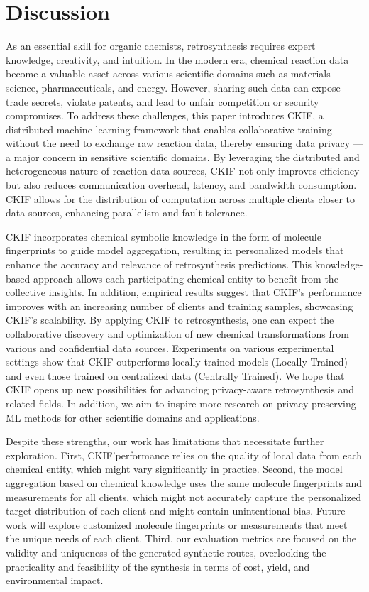 \section{Discussion}\label{sec:dis}


As an essential skill for organic chemists, retrosynthesis requires expert knowledge, creativity, and intuition. In the modern era, chemical reaction data become a valuable asset across various scientific domains such as materials science, pharmaceuticals, and energy. However, sharing such data can expose trade secrets, violate patents, and lead to unfair competition or security compromises. To address these challenges, this paper introduces CKIF, a distributed machine learning framework that enables collaborative training without the need to exchange raw reaction data, thereby ensuring data privacy --- a major concern in sensitive scientific domains. By leveraging the distributed and heterogeneous nature of reaction data sources, CKIF not only improves efficiency but also reduces communication overhead, latency, and bandwidth consumption. CKIF allows for the distribution of computation across multiple clients closer to data sources, enhancing parallelism and fault tolerance.


CKIF incorporates chemical symbolic knowledge in the form of molecule fingerprints to guide model aggregation, resulting in personalized models that enhance the accuracy and relevance of retrosynthesis predictions. This knowledge-based approach allows each participating chemical entity to benefit from the collective insights. In addition, empirical results suggest that CKIF's performance improves with an increasing number of clients and training samples, showcasing CKIF's scalability. By applying CKIF to retrosynthesis, one can expect the collaborative discovery and optimization of new chemical transformations from various and confidential data sources. Experiments on various experimental settings show that CKIF outperforms locally trained models (Locally Trained) and even those trained on centralized data (Centrally Trained). We hope that CKIF opens up new possibilities for advancing privacy-aware retrosynthesis and related fields. In addition, we aim to inspire more research on privacy-preserving ML methods for other scientific domains and applications.

Despite these strengths, our work has limitations that necessitate further exploration. First, CKIF'performance relies on the quality of local data from each chemical entity, which might vary significantly in practice. Second, the model aggregation based on chemical knowledge uses the same molecule fingerprints and measurements for all clients, which might not accurately capture the personalized target distribution of each client and might contain unintentional bias. Future work will explore customized molecule fingerprints or measurements that meet the unique needs of each client. Third, our evaluation metrics are focused on the validity and uniqueness of the generated synthetic routes, overlooking the practicality and feasibility of the synthesis in terms of cost, yield, and environmental impact.


